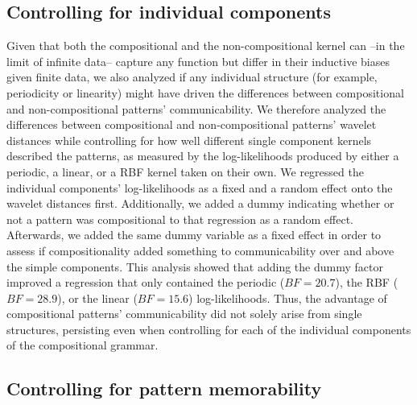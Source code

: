 \documentclass[a4paper,man, floatsintext, natbib]{apa6}
\begin{document}
\subsection{Controlling for individual components}

Given that both the compositional and the non-compositional kernel can --in the limit of infinite data-- capture any function but differ in their inductive biases given finite data, we also analyzed if any individual structure (for example, periodicity or linearity) might have driven the differences between compositional and non-compositional patterns' communicability. We therefore analyzed the differences between compositional and non-compositional patterns' wavelet distances while controlling for how well different single component kernels described the patterns, as measured by the log-likelihoods produced by either a periodic, a linear, or a RBF kernel taken on their own. We regressed the individual components' log-likelihoods as a fixed and a random effect onto the wavelet distances first. Additionally, we added a dummy indicating whether or not a pattern was compositional to that regression as a random effect. Afterwards, we added the same dummy variable as a fixed effect in order to assess if compositionality added something to communicability over and above the simple components. This analysis showed that adding the dummy factor improved a regression that only contained the periodic ($BF=20.7$), the RBF ($BF=28.9$), or the linear ($BF=15.6$) log-likelihoods. Thus, the advantage of compositional patterns' communicability did not solely arise from single structures, persisting even when controlling for each of the individual components of the compositional grammar. 


\subsection{Controlling for pattern memorability}
\end{document}
